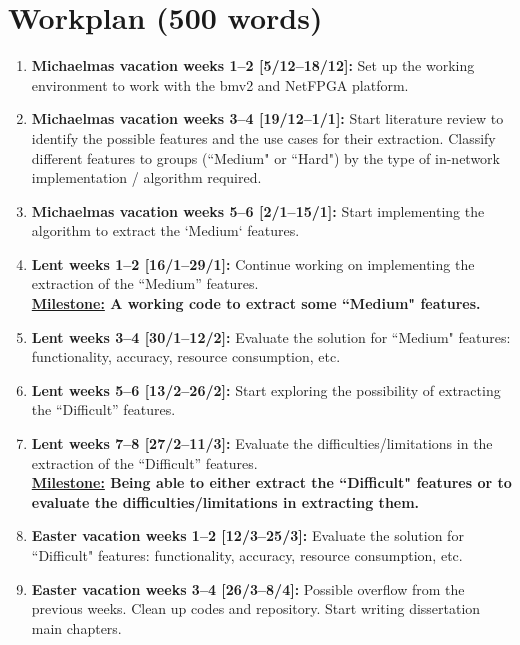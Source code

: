 \documentclass[12pt]{article}
\begin{document}
\section{Workplan (500 words)}
\begin{enumerate}[leftmargin=*]
	\item \textbf{Michaelmas vacation weeks 1--2 [5/12--18/12]:} Set up the working environment to work with the bmv2 and NetFPGA platform.
	
	\item \textbf{Michaelmas vacation weeks 3--4 [19/12--1/1]:} Start literature review to identify the possible features and the use cases for their extraction. Classify different features to groups (``Medium" or ``Hard") by the type of in-network implementation / algorithm required.
	
	\item \textbf{Michaelmas vacation weeks 5--6 [2/1--15/1]:} Start implementing the algorithm to extract the `Medium` features.
	
	\item \textbf{Lent weeks 1--2 [16/1--29/1]:} Continue working on implementing the extraction of the ``Medium'' features.\\
	\textbf{\underline{Milestone:} A working code to extract some ``Medium" features.}
	
	\item \textbf{Lent weeks 3--4 [30/1--12/2]:} Evaluate the solution for ``Medium" features: functionality, accuracy, resource consumption, etc.  
	
	\item \textbf{Lent weeks 5--6 [13/2--26/2]:} Start exploring the possibility of extracting the ``Difficult'' features.
	
	\item \textbf{Lent weeks 7--8 [27/2--11/3]:} Evaluate the difficulties/limitations in the extraction of the ``Difficult'' features. \\
	\textbf{\underline{Milestone:} Being able to either extract the ``Difficult" features or to evaluate the difficulties/limitations in extracting them.}
	
	\item \textbf{Easter vacation weeks 1--2 [12/3--25/3]:} Evaluate the solution for ``Difficult" features: functionality, accuracy, resource consumption, etc.  
	
	\item \textbf{Easter vacation weeks 3--4 [26/3--8/4]:} Possible overflow from the previous weeks. Clean up codes and repository. Start writing dissertation main chapters.
	

\end{enumerate}
\end{document}
